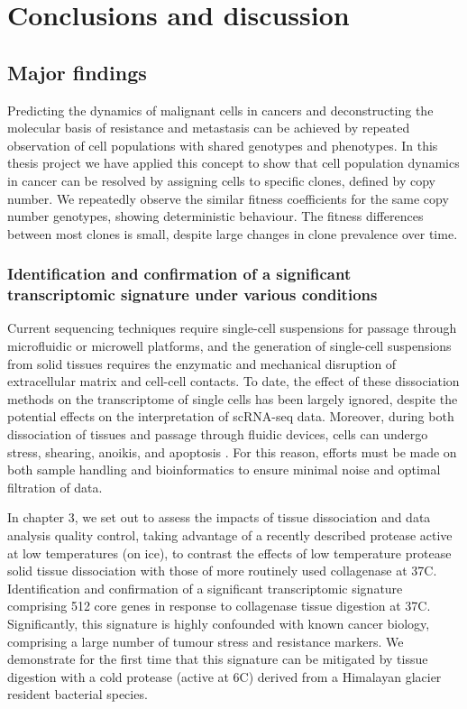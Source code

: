 
{\chapter{Conclusions and discussion}

}
\label{ch:Chapter6}

\section{Major findings}
Predicting the dynamics of malignant cells in cancers and deconstructing the molecular basis of resistance and metastasis can be achieved by repeated observation of cell populations with shared genotypes and phenotypes. In this thesis project we have applied this concept to show that cell population dynamics in cancer can be resolved by assigning cells to specific clones, defined by copy number. We repeatedly observe the similar fitness coefficients for the same copy number genotypes, showing deterministic behaviour. The fitness differences between most clones is small, despite large changes in clone prevalence over time.


\subsection{Identification and confirmation of a significant transcriptomic signature under various conditions}
 
 Current sequencing techniques require single-cell suspensions for passage through microfluidic or microwell platforms, and the generation of single-cell suspensions from solid tissues requires the enzymatic and mechanical disruption of extracellular matrix and cell-cell contacts. To date, the effect of these dissociation methods on the transcriptome of single cells has been largely ignored, despite the potential effects on the interpretation of scRNA-seq data.
  Moreover, during both dissociation of tissues and passage through fluidic devices, cells can undergo stress, shearing, anoikis, and apoptosis \cite{aljanahi2018introduction}.   For this reason, efforts must be made on both sample handling and bioinformatics to ensure minimal noise and optimal filtration of data.
  
  
In chapter 3, we set out to assess the impacts of tissue dissociation and data analysis quality control, taking advantage of a recently described protease active at low temperatures (on ice), to contrast the effects of low temperature protease solid tissue dissociation with those of more routinely used collagenase at 37\textdegree C. Identification and confirmation of a significant transcriptomic signature comprising 512 core genes in response to collagenase tissue digestion at 37\textdegree C. Significantly, this signature is highly confounded with known cancer biology, comprising a large number of tumour stress and resistance markers. We demonstrate for the first time that this signature can be mitigated by tissue digestion with a cold protease (active at 6\textdegree C) derived from a Himalayan glacier resident bacterial species.

